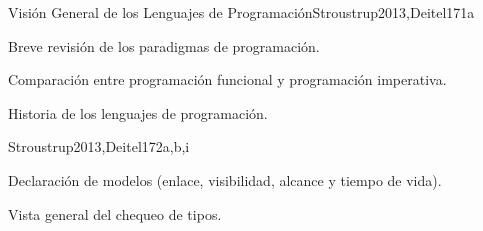 \begin{syllabus}
\begin{unit}{Visión General de los Lenguajes de Programación}{}{Stroustrup2013,Deitel17}{1}{a}
    \begin{topics}
        \item Breve revisión de los paradigmas de programación.
        \item Comparación entre programación funcional y programación imperativa.
        \item Historia de los lenguajes de programación.
    \end{topics}
    \begin{learningoutcomes}
        \item \SPHistoryLODiscussTheForLanguage [\Familiarity]
    \end{learningoutcomes}
\end{unit}

\begin{unit}{\PLBasicTypeSystems}{}{Stroustrup2013,Deitel17}{2}{a,b,i}
    \begin{topics}
        \item \PLBasicTypeSystemsTopicA
        \item Declaración de modelos (enlace, visibilidad, alcance y tiempo de vida).
        \item Vista general del chequeo de tipos.
    \end{topics}
    \begin{learningoutcomes}
        \item \PLBasicTypeSystemsLOForBoth [\Familiarity]
        \item \PLBasicTypeSystemsLOForA [\Familiarity]
        \item \PLBasicTypeSystemsLODescribeExamples [\Familiarity]
        \item \PLBasicTypeSystemsLOForMultiple [\Usage]
        \item \PLBasicTypeSystemsLOGiveAnThat [\Familiarity]
        \item \PLBasicTypeSystemsLOUseTypes [\Usage]
        \item \PLBasicTypeSystemsLOExplainHowDefine [\Familiarity]
        \item \PLBasicTypeSystemsLOWriteDown [\Usage]
        \item \PLBasicTypeSystemsLOExplainWhyType [\Familiarity]
        \item \PLBasicTypeSystemsLODefineAndPieces [\Usage]
        \item \PLBasicTypeSystemsLODiscussTheGenerics [\Familiarity]
        \item \PLBasicTypeSystemsLOExplainMultiple [\Familiarity]
    \end{learningoutcomes}
\end{unit}


\end{syllabus}
